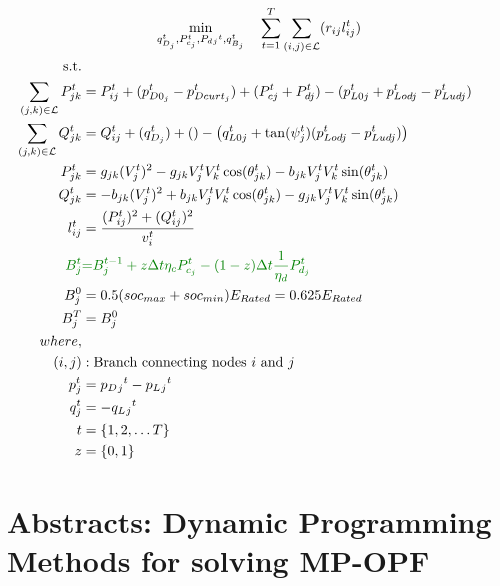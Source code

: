 \begin{gather}
    \min_{q_{D_j}^t,
	P_{c_j}^t, P_d{_j}^t, q_{B_j}^t} \quad
	\sum_{t = 1}^{T} \sum_{(i, j) \in \mathcal{L}} (r_{ij}l_{ij}^t) \\
	\begin{align}
		\text{s.t.} & {}\nonumber \\
		{ \sum_{(j, k) \in \mathcal{L}} P^t_{jk} } &= {P_{ij}^t  + (p^t_{D0_j} - p^t_{Dcurt_j} ) + (P^t_{cj} + P^t_{dj}) - (p^t_{L0j} + p^t_{Lodj} - p^t_{Ludj} ) } && \\
		{ \sum_{(j, k) \in \mathcal{L}} Q^t_{jk} } &= {Q_{ij}^t  + (q^t_{D_j}) + () - \left(q^t_{L0j} + \tan(\psi^t_j)(p^t_{Lodj} - p^t_{Ludj}) \right) } && \\
		{P^t_{jk}} &= { g_{jk} (V^t_j)^2 - g_{jk} V^t_j V^t_k \cos(\theta^t_{jk}) - b_{jk} V^t_j V^t_k \sin(\theta^t_{jk}) } && \\
		{Q^t_{jk}} &= { -b_{jk} (V^t_j)^2 + b_{jk} V^t_j V^t_k \cos(\theta^t_{jk}) - g_{jk} V^t_j V^t_k \sin(\theta^t_{jk}) } && \\
		{l_{ij}^t} & = {\frac{(P_{ij}^{t})^2 + (Q_{ij}^{t})^2}{v_i^t}} \\
		{\color{darkgreen}{ B_{j}^{t} }} &\color{darkgreen}{=} { \color{darkgreen}{ B_{j}^{t-1} + z \Delta t  \eta_c P_{c_j}^t - (1-z) \Delta t\frac{1}{\eta_d} P_{d_j}^t } } \\
		{ B_{j}^{0} } &= { 0.5(soc_{max}+soc_{min})E_{Rated} = 0.625E_{Rated}} \\
		{ B_{j}^{T} } &= { B_{j}^{0}} \\
		{where,} & {} \\
		{(i, j)} &: {\text{Branch connecting nodes $i$ and $j$}} \\
		{p_j^t} &= {p_D{_j}^t - p_L{_j}^t} \\
		{q_j^t} &= {-q_L{_j}^t} \\
		{t} &= {\{1, 2, \ldots T\}} \\
		{z} &= {\{0, 1\}}
	\end{align}
\end{gather}

\chapter{Abstracts: Dynamic Programming Methods for solving MP-OPF}

